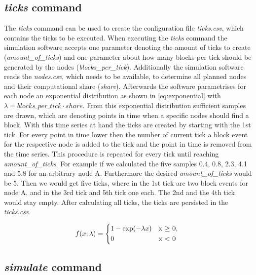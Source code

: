 \subsection{\textit{ticks} command} \label{chap:ticks_command}

The \textit{ticks} command can be used to create the configuration file \textit{ticks.csv}, which contains the ticks to be executed.
When executing the \textit{ticks} command the simulation software accepts one parameter denoting the amount of ticks to create (\textit{amount\_of\_ticks}) and one parameter about how many blocks per tick should be generated by the nodes (\textit{blocks\_per\_tick}).
Additionally the simulation software reads the \textit{nodes.csv}, which needs to be available, to determine all planned nodes and their computational share (\textit{share}).
Afterwards the software parametrises for each node an exponential distribution as shown in \ref{eq:exponential} with $\lambda = blocks\_per\_tick \cdot share$.
From this exponential distribution sufficient samples are drawn, which are denoting points in time when a specific nodes should find a block.
With this time series at hand the ticks are created by starting with the 1st tick.
For every point in time lower then the number of current tick a block event for the respective node is added to the tick and the point in time is removed from the time series.
This procedure is repeated for every tick until reaching \textit{amount\_of\_ticks}.
For example if we calculated the five samples 0.4, 0.8, 2.3, 4.1 and 5.8 for an arbitrary node A.
Furthermore the desired \textit{amount\_of\_ticks} would be 5.
Then we would get five ticks, where in the 1st tick are two block events for node A, and in the 3rd tick  and 5th tick one each.
The 2nd and the 4th tick would stay empty. After calculating all ticks, the ticks are persisted in the \textit{ticks.csv}.

 \begin{equation} \label{eq:exponential}
f(x; \lambda) = \begin{cases*}
        1 - \exp(-\lambda x) & x  $\geq$ 0, \\
        0                                    &  x < 0
        \end{cases*}
\end{equation}

\subsection{\textit{simulate} command} \label{chap:simulate_command}


